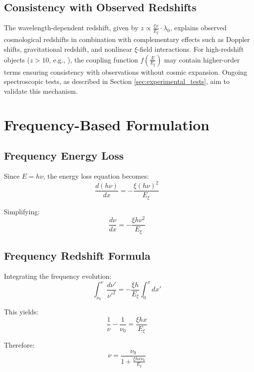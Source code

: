 \documentclass[12pt,a4paper]{article}
\newcommand{\Exi}{E_\xi}
\newcommand{\lambdazero}{\lambda_0}
\newcommand{\nuzero}{\nu_0}
\theoremstyle{definition}
\begin{document}
	\subsection{Consistency with Observed Redshifts}
	The wavelength-dependent redshift, given by $z \propto \frac{\xi x}{\Exi} \cdot \lambdazero$, explains observed cosmological redshifts in combination with complementary effects such as Doppler shifts, gravitational redshift, and nonlinear $\xi$-field interactions. For high-redshift objects ($z > 10$, e.g., \cite{jwst_early}), the coupling function $f\left(\frac{E}{\Exi}\right)$ may contain higher-order terms ensuring consistency with observations without cosmic expansion. Ongoing spectroscopic tests, as described in Section \ref{sec:experimental_tests}, aim to validate this mechanism.
	
	\section{Frequency-Based Formulation}
	
	\subsection{Frequency Energy Loss}
	
	Since $E = h\nu$, the energy loss equation becomes:
	\begin{equation}
		\frac{d(h\nu)}{dx} = -\frac{\xi (h\nu)^2}{\Exi}
	\end{equation}
	
	Simplifying:
	\begin{equation}
		\frac{d\nu}{dx} = -\frac{\xi h \nu^2}{\Exi}
	\end{equation}
	
	\subsection{Frequency Redshift Formula}
	
	Integrating the frequency evolution:
	\begin{equation}
		\int_{\nuzero}^{\nu} \frac{d\nu'}{\nu'^2} = -\frac{\xi h}{\Exi} \int_0^x dx'
	\end{equation}
	
	This yields:
	\begin{equation}
		\frac{1}{\nu} - \frac{1}{\nuzero} = \frac{\xi h x}{\Exi}
	\end{equation}
	
	Therefore:
	\begin{equation}
		\nu = \frac{\nuzero}{1 + \frac{\xi h x \nuzero}{\Exi}}
	\end{equation}
	
\end{document}

